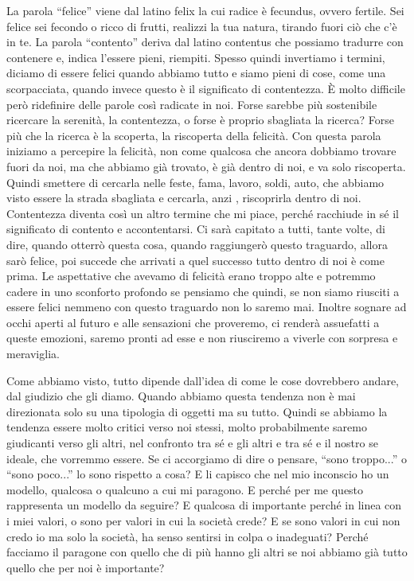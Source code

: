 \documentclass[12pt]{book} %
\begin{document}
La parola “felice” viene dal latino felix la cui radice è fecundus, ovvero fertile. Sei felice sei fecondo o ricco di
frutti, realizzi la tua natura, tirando fuori ciò che c'è in te. La parola “contento” deriva dal
latino contentus che possiamo tradurre con contenere e, indica l'essere pieni, riempiti. Spesso
quindi invertiamo i termini, diciamo di essere felici quando abbiamo tutto e siamo pieni di cose, come una
scorpacciata, quando invece questo è il significato di contentezza. È molto difficile però ridefinire delle parole così
radicate in noi. Forse sarebbe più sostenibile ricercare la serenità, la contentezza, o forse è proprio sbagliata la
ricerca? Forse più che la ricerca è la scoperta, la riscoperta della felicità. Con questa parola iniziamo a percepire
la felicità, non come qualcosa che ancora dobbiamo trovare fuori da noi, ma che abbiamo già trovato, è già dentro di
noi, e va solo riscoperta. Quindi smettere di cercarla nelle feste, fama, lavoro, soldi, auto, che abbiamo visto essere
la strada sbagliata e cercarla, anzi , riscoprirla dentro di noi. Contentezza diventa così un altro termine che mi
piace, perché racchiude in sé il significato di contento e accontentarsi. Ci sarà capitato a tutti, tante volte, di
dire, quando otterrò questa cosa, quando raggiungerò questo traguardo, allora sarò felice, poi succede che arrivati a
quel successo tutto dentro di noi è come prima. Le aspettative che avevamo di felicità erano troppo alte e potremmo
cadere in uno sconforto profondo se pensiamo che quindi, se non siamo riusciti a essere felici nemmeno con questo
traguardo non lo saremo mai. Inoltre sognare ad occhi aperti al futuro e alle sensazioni che proveremo, ci renderà
assuefatti a queste emozioni, saremo pronti ad esse e non riusciremo a viverle con sorpresa e meraviglia. 

Come abbiamo visto, tutto dipende dall'idea di come le cose dovrebbero andare, dal giudizio che gli
diamo. Quando abbiamo questa tendenza non è mai direzionata solo su una tipologia di oggetti ma su tutto. Quindi se
abbiamo la tendenza essere molto critici verso noi stessi, molto probabilmente saremo giudicanti verso gli altri, nel
confronto tra sé e gli altri e tra sé e il nostro se ideale, che vorremmo essere. Se ci accorgiamo di dire o pensare,
“sono troppo...” o “sono poco...” lo sono rispetto a cosa? E li capisco che nel mio inconscio ho un modello, qualcosa o
qualcuno a cui mi paragono. E perché per me questo rappresenta un modello da seguire? E qualcosa di importante perché
in linea con i miei valori, o sono per valori in cui la società crede? E se sono valori in cui non credo io ma solo la
società, ha senso sentirsi in colpa o inadeguati? Perché facciamo il paragone con quello che di più hanno gli altri se
noi abbiamo già tutto quello che per noi è importante?
\end{document}

